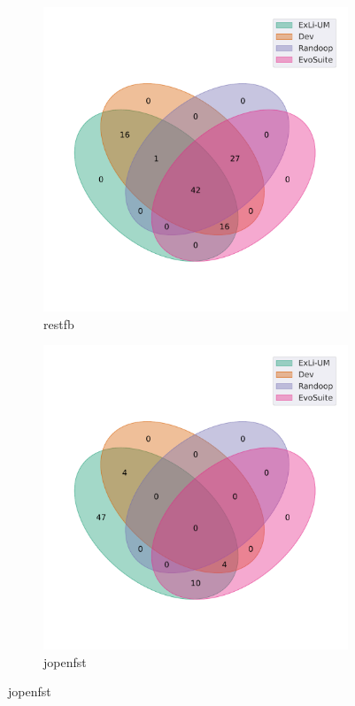 \begin{figure}[t]\ContinuedFloat
\begin{subfigure}[b]{0.45\textwidth}
\includegraphics[width=\textwidth]{figures/venn/restfb_restfb-venn.pdf}
\vspace{-10pt}
\caption{restfb}
\label{fig:venn-restfb_restfb}
\end{subfigure}
\hfill
\begin{subfigure}[b]{0.45\textwidth}
\includegraphics[width=\textwidth]{figures/venn/steveash_jopenfst-venn.pdf}
\vspace{-10pt}
\caption{jopenfst}
\label{fig:venn-steveash_jopenfst}
\end{subfigure}
\end{figure}
